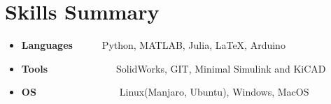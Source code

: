 \documentclass[a4paper,20pt]{article}
\newcommand{\resumeItem}[2]{
  \item\small{
    \textbf{#1}{#2 \vspace{-2pt}}
  }
}
\newcommand{\resumeSubItem}[2]{\resumeItem{#1}{#2}\vspace{-3pt}}
\newcommand{\resumeSubHeadingListStart}{\begin{itemize}[leftmargin=*]}
\newcommand{\resumeSubHeadingListEnd}{\end{itemize}}
\begin{document}
\vspace{-10pt}

\section{Skills Summary}
	\resumeSubHeadingListStart
	\resumeSubItem{Languages}{~~~~~~Python, MATLAB, Julia, \LaTeX, Arduino }
	\resumeSubItem{Tools}{~~~~~~~~~~~~~~SolidWorks, GIT, Minimal Simulink and KiCAD}
\resumeSubItem{OS}{~~~~~~~~~~~~~~~~~Linux(Manjaro, Ubuntu), Windows, MacOS}
\resumeSubHeadingListEnd

\vspace{-5pt}


%
\end{document}
